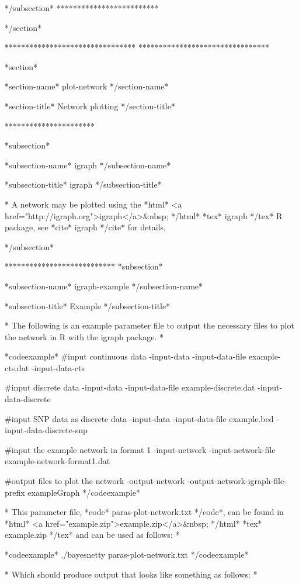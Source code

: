 */subsection* *************************

*/section*

******************************** ********************************

*section*

*section-name* plot-network */section-name*

*section-title* Network plotting */section-title*

**********************

*subsection*

*subsection-name* igraph */subsection-name*

*subsection-title* igraph */subsection-title*

* A network may be plotted using the *html* <a href="http://igraph.org">igraph</a>&nbsp; */html* *tex* igraph */tex* R package, see *cite* igraph */cite* for details,

*/subsection*

*************************** *subsection*

*subsection-name* igraph-example */subsection-name*

*subsection-title* Example */subsection-title*


* The following is an example parameter file to output the necessary files to plot the network in R with the igraph package. *

*codeexample* #input continuous data -input-data -input-data-file example-cts.dat -input-data-cts

#input discrete data -input-data -input-data-file example-discrete.dat -input-data-discrete

#input SNP data as discrete data -input-data -input-data-file example.bed -input-data-discrete-snp

#input the example network in format 1 -input-network -input-network-file example-network-format1.dat

#output files to plot the network -output-network -output-network-igraph-file-prefix exampleGraph */codeexample*

* This parameter file, *code* paras-plot-network.txt */code*, can be found in *html* <a href="example.zip">example.zip</a>&nbsp; */html* *tex* example.zip */tex* and can be used as follows: *

*codeexample* ./bayesnetty paras-plot-network.txt */codeexample*

* Which should produce output that looks like something as follows: *

